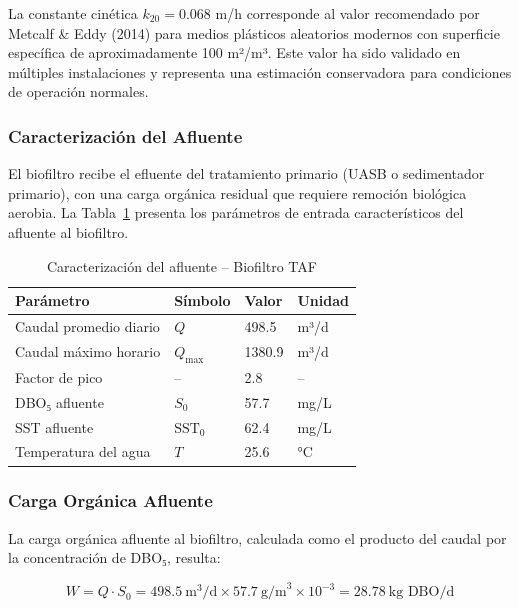 \documentclass[12pt,a4paper]{article}
\begin{document}
La constante cinética $k_{20} = 0.068$ m/h corresponde al valor recomendado por Metcalf \& Eddy (2014) para medios plásticos aleatorios modernos con superficie específica de aproximadamente 100 m²/m³. Este valor ha sido validado en múltiples instalaciones y representa una estimación conservadora para condiciones de operación normales.

\subsubsection*{Caracterización del Afluente}

El biofiltro recibe el efluente del tratamiento primario (UASB o sedimentador primario), con una carga orgánica residual que requiere remoción biológica aerobia. La Tabla~\ref{tab:entrada_taf} presenta los parámetros de entrada característicos del afluente al biofiltro.

\begin{table}[H]
\centering
\caption{Caracterización del afluente -- Biofiltro TAF}
\label{tab:entrada_taf}
\begin{tabular}{llll}
\toprule
\textbf{Parámetro} & \textbf{Símbolo} & \textbf{Valor} & \textbf{Unidad} \\
\midrule
Caudal promedio diario & $Q$ & 498.5 & m³/d \\
Caudal máximo horario & $Q_{\text{max}}$ & 1380.9 & m³/d \\
Factor de pico & -- & 2.8 & -- \\
DBO₅ afluente & $S_0$ & 57.7 & mg/L \\
SST afluente & $\text{SST}_0$ & 62.4 & mg/L \\
Temperatura del agua & $T$ & 25.6 & °C \\

\bottomrule
\end{tabular}
\end{table}

\subsubsection*{Carga Orgánica Afluente}

La carga orgánica afluente al biofiltro, calculada como el producto del caudal por la concentración de DBO₅, resulta:

\begin{equation}
W = Q \cdot S_0 = 498.5\ \text{m}^3\text{/d} \times 57.7\ \text{g/m}^3 \times 10^{-3} = 28.78\ \text{kg DBO/d}
\end{equation}
\end{document}
